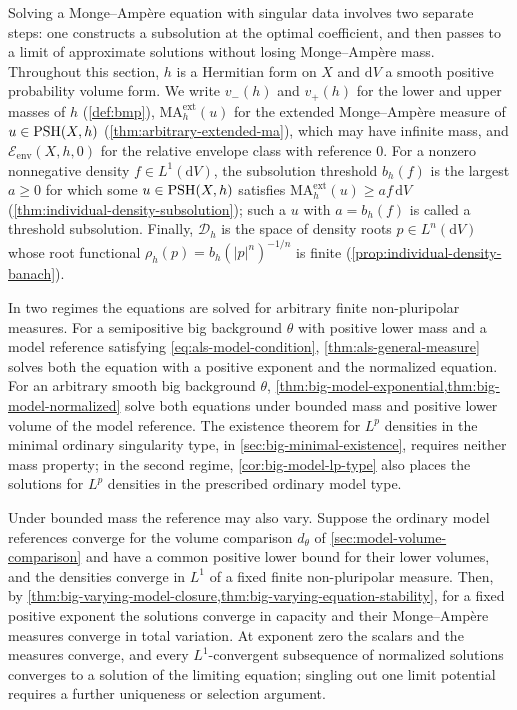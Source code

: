 Solving a Monge--Amp\`ere equation with singular data involves two separate steps: one constructs a subsolution at the optimal coefficient, and then passes to a limit of approximate solutions without losing Monge--Amp\`ere mass. Throughout this section, $h$ is a Hermitian form on $X$ and $\mathrm{d}V$ a smooth positive probability volume form. We write $v_-(h)$ and $v_+(h)$ for the lower and upper masses of $h$ (\cref{def:bmp}), $\mathrm{MA}^{\mathrm{ext}}_h(u)$ for the extended Monge--Amp\`ere measure of $u\in\mathrm{PSH}(X,h)$ (\cref{thm:arbitrary-extended-ma}), which may have infinite mass, and $\mathcal E_{\mathrm{env}}(X,h,0)$ for the relative envelope class with reference $0$. For a nonzero nonnegative density $f\in L^1(\mathrm{d}V)$, the subsolution threshold $b_h(f)$ is the largest $a\geq0$ for which some $u\in\mathrm{PSH}(X,h)$ satisfies $\mathrm{MA}^{\mathrm{ext}}_h(u)\geq af\,\mathrm{d}V$ (\cref{thm:individual-density-subsolution}); such a $u$ with $a=b_h(f)$ is called a threshold subsolution. Finally, $\mathcal D_h$ is the space of density roots $p\in L^n(\mathrm{d}V)$ whose root functional $\rho_h(p)=b_h(|p|^n)^{-1/n}$ is finite (\cref{prop:individual-density-banach}).

In two regimes the equations are solved for arbitrary finite non-pluripolar measures. For a semipositive big background $\theta$ with positive lower mass and a model reference satisfying \eqref{eq:als-model-condition}, \cref{thm:als-general-measure} solves both the equation with a positive exponent and the normalized equation. For an arbitrary smooth big background $\theta$, \cref{thm:big-model-exponential,thm:big-model-normalized} solve both equations under bounded mass and positive lower volume of the model reference. The existence theorem for $L^p$ densities in the minimal ordinary singularity type, in \cref{sec:big-minimal-existence}, requires neither mass property; in the second regime, \cref{cor:big-model-lp-type} also places the solutions for $L^p$ densities in the prescribed ordinary model type.

Under bounded mass the reference may also vary. Suppose the ordinary model references converge for the volume comparison $d_\theta$ of \cref{sec:model-volume-comparison} and have a common positive lower bound for their lower volumes, and the densities converge in $L^1$ of a fixed finite non-pluripolar measure. Then, by \cref{thm:big-varying-model-closure,thm:big-varying-equation-stability}, for a fixed positive exponent the solutions converge in capacity and their Monge--Amp\`ere measures converge in total variation. At exponent zero the scalars and the measures converge, and every $L^1$-convergent subsequence of normalized solutions converges to a solution of the limiting equation; singling out one limit potential requires a further uniqueness or selection argument.

